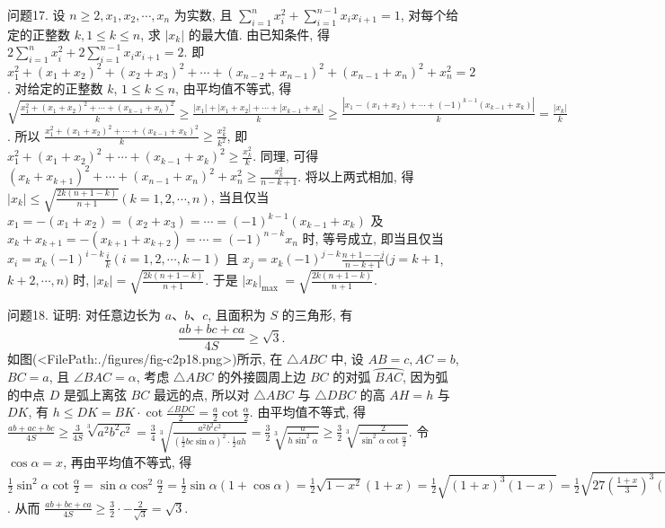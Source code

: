 问题17. 设 $n \geqslant 2, x_1, x_2, \cdots, x_n$ 为实数, 且 $\sum_{i=1}^n x_i^2+\sum_{i=1}^{n-1} x_i x_{i+1}=1$, 对每个给定的正整数 $k, 1 \leqslant k \leqslant n$, 求 $\left|x_k\right|$ 的最大值.
由已知条件, 得 $2 \sum_{i=1}^n x_i^2+2 \sum_{i=1}^{n-1} x_i x_{i+1}=2$. 即 $x_1^2+\left(x_1+x_2\right)^2+ \left(x_2+x_3\right)^2+\cdots+\left(x_{n-2}+x_{n-1}\right)^2+\left(x_{n-1}+x_n\right)^2+x_n^2=2$. 对给定的正整数 $k$, $1 \leqslant k \leqslant n$, 由平均值不等式, 得 $\sqrt{\frac{x_1^2+\left(x_1+x_2\right)^2+\cdots+\left(x_{k-1}+x_k\right)^2}{k}} \geqslant \frac{\left|x_1\right|+\left|x_1+x_2\right|+\cdots+\left|x_{k-1}+x_k\right|}{k} \geqslant \frac{\left|x_1-\left(x_1+x_2\right)+\cdots+(-1)^{k-1}\left(x_{k-1}+x_k\right)\right|}{k}=\frac{\left|x_k\right|}{k}$. 所以 $\frac{x_1^2+\left(x_1+x_2\right)^2+\cdots+\left(x_{k-1}+x_k\right)^2}{k} \geqslant \frac{x_k^2}{k^2}$, 即 $x_1^2+\left(x_1+x_2\right)^2 +\cdots+\left(x_{k-1}+x_k\right)^2 \geqslant \frac{x_k^2}{k}$. 同理, 可得 $\left(x_k+x_{k+1}\right)^2+\cdots+\left(x_{n-1}+x_n\right)^2+x_n^2 \geqslant \frac{x_k^2}{n-k+1}$. 将以上两式相加, 得 $\left|x_k\right| \leqslant \sqrt{\frac{2 k(n+1-k)}{n+1}}(k=1,2, \cdots, n)$, 当且仅当 $x_1=-\left(x_1+x_2\right)=\left(x_2+x_3\right)=\cdots=(-1)^{k-1}\left(x_{k-1}+x_k\right)$ 及 $x_k+x_{k+1}=-\left(x_{k+1}+x_{k+2}\right)=\cdots=(-1)^{n-k} x_n$ 时, 等号成立, 即当且仅当 $x_i= x_k(-1)^{i-k} \frac{i}{k}(i=1,2, \cdots, k-1)$ 且 $x_j=x_k(-1)^{j-k} \frac{n+1--j}{n-k+1}(j=k+1$, $k+2, \cdots, n)$ 时, $\left|x_k\right|=\sqrt{\frac{2 k(n+1-k)}{n+1}}$. 于是 $\left|x_k\right|_{\text {max }}= \sqrt{\frac{2 k(n+1-k)}{n+1}}$.



问题18. 证明: 对任意边长为 $a 、 b 、 c$, 且面积为 $S$ 的三角形, 有
$$
\frac{a b+b c+c a}{4 S} \geqslant \sqrt{3} \text {. }
$$
如图(<FilePath:./figures/fig-c2p18.png>)所示, 在 $\triangle A B C$ 中, 设 $A B=c, A C=b$, $B C=a$, 且 $\angle B A C=\alpha$, 考虑 $\triangle A B C$ 的外接圆周上边 $B C$ 的对弧 $\overparen{B A C}$, 因为弧的中点 $D$ 是弧上离弦 $B C$ 最远的点, 所以对 $\triangle A B C$ 与 $\triangle D B C$ 的高 $A H=h$ 与 $D K$, 有 $h \leqslant D K=B K \cdot \cot \frac{\angle B D C}{2}=\frac{a}{2} \cot \frac{\alpha}{2}$. 由平均值不等式, 得
$\frac{a b+a c+b c}{4 S} \geqslant \frac{3}{4 S} \sqrt[3]{a^2 b^2 c^2}=\frac{3}{4} \sqrt[3]{\frac{a^2 b^2 c^2}{\left(\frac{1}{2} b c \sin \alpha\right)^2 \cdot \frac{1}{2} a h}}=\frac{3}{2} \sqrt[3]{\frac{a}{h \sin ^2 \alpha}} \geqslant \frac{3}{2} \sqrt[3]{\frac{2}{\sin ^2 \alpha \cot \frac{\alpha}{2}}}$. 令 $\cos \alpha=x$, 再由平均值不等式, 得 $\frac{1}{2} \sin ^2 \alpha \cot \frac{\alpha}{2}=\sin \alpha \cos ^2 \frac{\alpha}{2}=\frac{1}{2} \sin \alpha(1+\cos \alpha)=\frac{1}{2} \sqrt{1-x^2}(1+x)=\frac{1}{2} \sqrt{(1+x)^3(1-x)}=\frac{1}{2} \sqrt{27\left(\frac{1+x}{3}\right)^3(1-x)} \leqslant \frac{1}{2} \sqrt{27}\left[\frac{1}{4}\left(3 \cdot \frac{1+x}{3}+(1-x)\right)\right]^2 =\frac{1}{2} \sqrt{27}\left(\frac{2}{4}\right)^2=\left(\frac{\sqrt{3}}{2}\right)^3$. 从而 $\frac{a b+b c+c a}{4 S} \geqslant \frac{3}{2} \cdot-\frac{2}{\sqrt{3}}=\sqrt{3}$.



